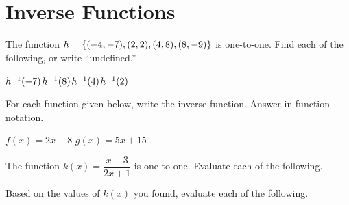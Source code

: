 \section*{Inverse Functions}
The function $h=\left\{(-4,-7),(2,2),(4,8),(8,-9)\right\}$ is one-to-one. Find each of the following, or write ``undefined.''
\begin{smenum}
\mitemxxxx
{$h^{-1}(-7)$}{$h^{-1}(8)$}{$h^{-1}(4)$}{$h^{-1}(2)$}
\end{smenum}
For each function given below, write the inverse function. Answer in function notation.
\begin{smenum}
\mitemxx
{$f(x)=2x-8$}
{$g(x)=5x+15$}
\end{smenum}
The function $k(x)=\dfrac{x-3}{2x+1}$ is one-to-one. Evaluate each of the following.
\begin{smenum}\end{smenum}
Based on the values of $k(x)$ you found, evaluate each of the following.
\begin{smenum}\end{smenum}

